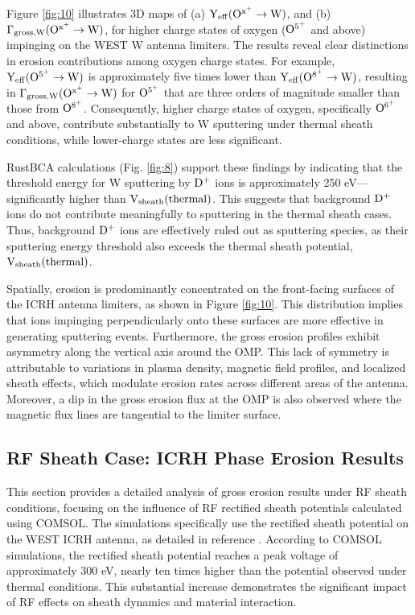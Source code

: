 \documentclass[10pt]{iopart}
\begin{document}
Figure \ref{fig:10} illustrates 3D maps of (a) $\rm  Y_{{eff}}(O^{x^+} \rightarrow W)$, and (b) $\rm  \Gamma_{{gross, W}}(O^{x^+} \rightarrow W)$, for higher charge states of oxygen ($\rm  O^{5^+}$ and above) impinging on the WEST W antenna limiters. The results reveal clear distinctions in erosion contributions among oxygen charge states. For example, \(\rm  Y_{{eff}}(O^{5^+} \rightarrow W) \) is approximately five times lower than $\rm  Y_{{eff}}(O^{8^+} \rightarrow W)$, resulting in $\rm  \Gamma_{{gross, W}}(O^{x^+} \rightarrow W)$ for \(\rm  O^{5^+} \) that are three orders of magnitude smaller than those from $\rm  O^{8^+}$. Consequently, higher charge states of oxygen, specifically \(\rm O^{6^+} \) and above, contribute substantially to W sputtering under thermal sheath conditions, while lower-charge states are less significant.

RustBCA calculations (Fig. \ref{fig:8}) support these findings by indicating that the threshold energy for W sputtering by $\rm D^+$ ions is approximately 250 eV—significantly higher than $\rm V_{{sheath}}({thermal}) $. This suggests that background $\rm D^+$ ions do not contribute meaningfully to sputtering in the thermal sheath cases. Thus, background $\rm D^+$ ions are effectively ruled out as sputtering species, as their sputtering energy threshold also exceeds the thermal sheath potential, $\rm V_{sheath}(thermal)$.

Spatially, erosion is predominantly concentrated on the front-facing surfaces of the ICRH antenna limiters, as shown in Figure \ref{fig:10}. This distribution implies that ions impinging perpendicularly onto these surfaces are more effective in generating sputtering events. Furthermore, the gross erosion profiles exhibit asymmetry along the vertical axis around the OMP. This lack of symmetry is attributable to variations in plasma density, magnetic field profiles, and localized sheath effects, which modulate erosion rates across different areas of the antenna. Moreover, a dip in the gross erosion flux at the OMP  is also observed where the magnetic flux lines are tangential to the limiter surface. 

\subsection{RF Sheath Case: ICRH Phase Erosion Results}
This section provides a detailed analysis of gross erosion results under RF sheath conditions, focusing on the influence of RF rectified sheath potentials calculated using COMSOL. The simulations specifically use the rectified sheath potential on the WEST ICRH antenna, as detailed in reference . According to COMSOL simulations, the rectified sheath potential reaches a peak voltage of approximately 300 eV, nearly ten times higher than the potential observed under thermal conditions. This substantial increase demonstrates the significant impact of RF effects on sheath dynamics and material interaction.
\end{document}
